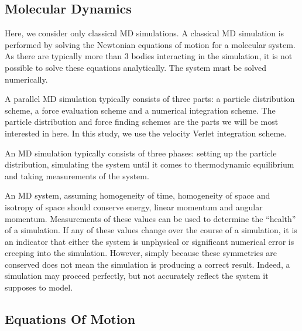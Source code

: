 %
%
\subsection{Molecular Dynamics}

%
%
%

Here, we consider only classical MD simulations.
%
A classical MD simulation is performed by
solving the Newtonian equations of motion for
a molecular system.
%
As there are typically more than 3 bodies interacting in the simulation,
it is not possible to solve these equations analytically.
%
The system must be solved numerically.


A parallel MD simulation typically consists of three parts:
a particle distribution scheme,
a force evaluation scheme and
a numerical integration scheme.
%
The particle distribution and force finding schemes are
the parts we will be most interested in here.
%
In this study, we use the velocity Verlet integration scheme.


An MD simulation typically consists of three phases:
setting up the particle distribution,
simulating the system until it comes to thermodynamic equilibrium and
taking measurements of the system.



%
%

An MD system,
assuming homogeneity of time,
homogeneity of space and
isotropy of space
should conserve energy, linear momentum and angular momentum.
%
Measurements of these values can be used to
determine the ``health'' of a simulation.
%
If any of these values change over the course of a simulation,
it is an indicator that either the system is unphysical or
significant numerical error is creeping into the simulation.
%
However, simply because these symmetries are conserved does not mean
the simulation is producing a correct result.
%
Indeed, a simulation may proceed perfectly, but not accurately reflect
the system it supposes to model.




\subsection{Equations Of Motion}

